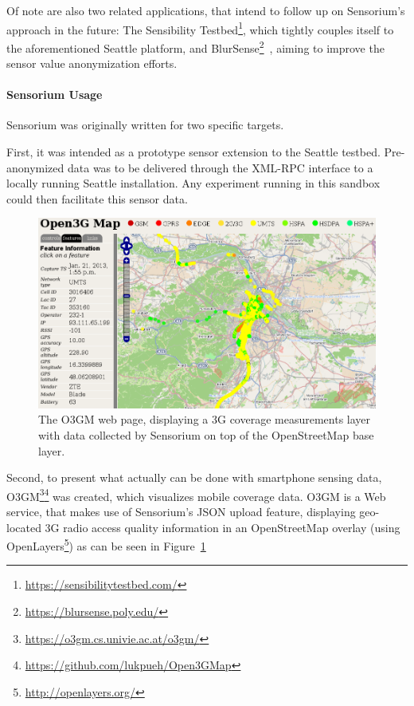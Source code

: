 Of note are also two related applications, that intend to follow up on Sensorium's approach in the future: The Sensibility Testbed\footnote{\url{https://sensibilitytestbed.com/}}, which tightly couples itself to the aforementioned Seattle platform, and BlurSense\footnote{\url{https://blursense.poly.edu/}}~\cite{6798970}, aiming to improve the sensor value anonymization efforts. 


\paragraph{Sensorium Usage}

Sensorium was originally written for two specific targets.

First, it was intended as a prototype sensor extension to the Seattle testbed. Pre-anonymized data was to be delivered through the \acrshort{XML}-\acrshort{RPC} interface to a locally running Seattle installation. Any experiment running in this sandbox could then facilitate this sensor data.

\begin{figure}[htb]
	\centering
	\includegraphics[width=\textwidth]{images/o3gm.png}
	\caption{The \acrshort{O3GM} web page, displaying a \acrshort{3G} coverage measurements layer with data collected by Sensorium on top of the OpenStreetMap base layer.}
\label{c5:fig:ogggm}
\end{figure}

Second, to present what actually can be done with smartphone sensing data, \gls{O3GM}\footnote{\url{https://o3gm.cs.univie.ac.at/o3gm/}}\footnote{\url{https://github.com/lukpueh/Open3GMap}} was created, which visualizes mobile coverage data. \gls{O3GM} is a Web service, that makes use of Sensorium's \acrshort{JSON} upload feature, displaying geo-located \gls{3G} radio access quality information in an OpenStreetMap overlay (using OpenLayers\footnote{\url{http://openlayers.org/}}) as can be seen in Figure~\ref{c5:fig:ogggm}


